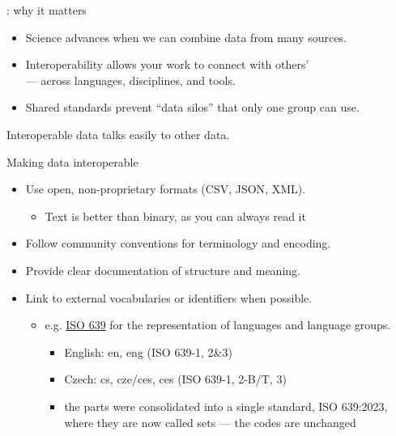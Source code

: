 \documentclass[aspectratio=169]{beamer}
\begin{document}
\begin{frame}{: why it matters}
\begin{itemize}
  \item Science advances when we can combine data from many sources.  
  \item Interoperability allows your work to connect with others’
    \\ \quad — across languages, disciplines, and tools.  
  \item Shared standards prevent “data silos” that only one group can use.
\end{itemize}
\medskip
Interoperable data talks easily to other data.
\end{frame}

\begin{frame}{Making data interoperable}
\begin{itemize}
\item Use open, non-proprietary formats (CSV, JSON, XML).
  \begin{itemize}
  \item Text is better than binary, as you can always read it
  \end{itemize}
\item Follow community conventions for terminology and encoding.  
\item Provide clear documentation of structure and meaning.  
\item Link to external vocabularies or identifiers when possible.
  \begin{itemize}
  \item e.g. \href{https://en.wikipedia.org/wiki/ISO_639}{ISO 639} for the representation of languages and language groups.
    \begin{itemize}
    \item English: en, eng (ISO 639-1, 2\&3)
    \item Czech: cs, cze/ces, ces (ISO 639-1, 2-B/T, 3)
    \item the parts were consolidated into a single standard, ISO 639:2023, where they are now called sets --- the codes are unchanged
    \end{itemize}
  \end{itemize}
\end{itemize}
\end{frame}
\end{document}
